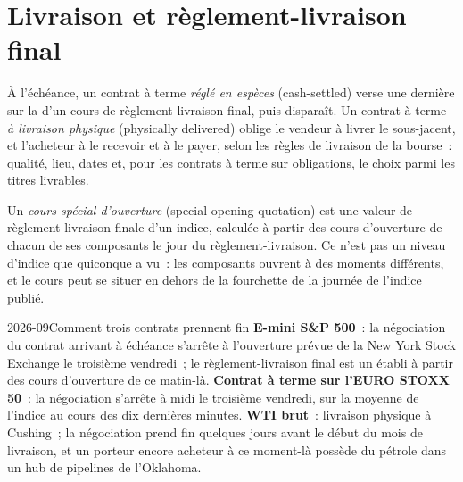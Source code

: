\section{Livraison et règlement-livraison final}

\begin{definition}\label{def:m1:basis-roll-and-delivery:delivery}
À l'échéance, un contrat à terme \emph{réglé en espèces} (cash-settled) verse une dernière
 sur la  d'un cours de règlement-livraison final, puis disparaît.
Un contrat à terme \emph{à livraison physique} (physically delivered) oblige le
vendeur à livrer le sous-jacent, et l'acheteur à le recevoir et à le payer, selon les
règles de livraison de la bourse~: qualité, lieu, dates et, pour les contrats à terme sur obligations, le
choix parmi les titres livrables.
\end{definition}

\begin{definition}\label{def:m1:basis-roll-and-delivery:soq}
Un \emph{cours spécial d'ouverture} (special opening quotation) est une
valeur de règlement-livraison finale d'un indice, calculée à partir des cours d'ouverture de chacun
de ses composants le jour du règlement-livraison. Ce n'est pas un niveau d'indice que
quiconque a vu~: les composants ouvrent à des moments différents, et le cours peut
se situer en dehors de la fourchette de la journée de l'indice publié.
\end{definition}

\begin{dated}{2026-09}{Comment trois contrats prennent fin}\label{dat:m1:basis-roll-and-delivery:ends}
\textbf{E-mini S\&P 500}~: la négociation du contrat arrivant à échéance s'arrête à
l'ouverture prévue de la New York Stock Exchange le troisième vendredi~; le règlement-livraison final
est un  établi à partir des cours d'ouverture de ce
matin-là. \textbf{Contrat à terme sur l'EURO STOXX 50}~: la négociation s'arrête à midi le
troisième vendredi, sur la moyenne de l'indice au cours des dix dernières minutes.
\textbf{WTI brut}~: livraison physique à Cushing~; la négociation prend fin quelques jours
avant le début du mois de livraison, et un porteur encore acheteur à ce moment-là possède
du pétrole dans un hub de pipelines de l'Oklahoma.
\end{dated}

